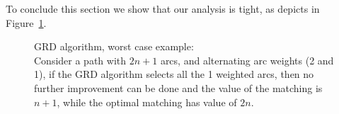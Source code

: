 To conclude this section we show that our analysis is tight, 
as depicts in Figure~\ref{fig:grd worst}.
\begin{figure}
\centering

\caption{
\label{fig:grd worst}
GRD algorithm, worst case example: \\
Consider a path with $2n + 1$ arcs, 
and alternating arc weights (2 and 1),
if the GRD algorithm selects all the 1 weighted arcs,
then no further improvement can be done and the value of the matching is $n + 1$,
while the optimal matching has value of $2n$. 
}
\end{figure}